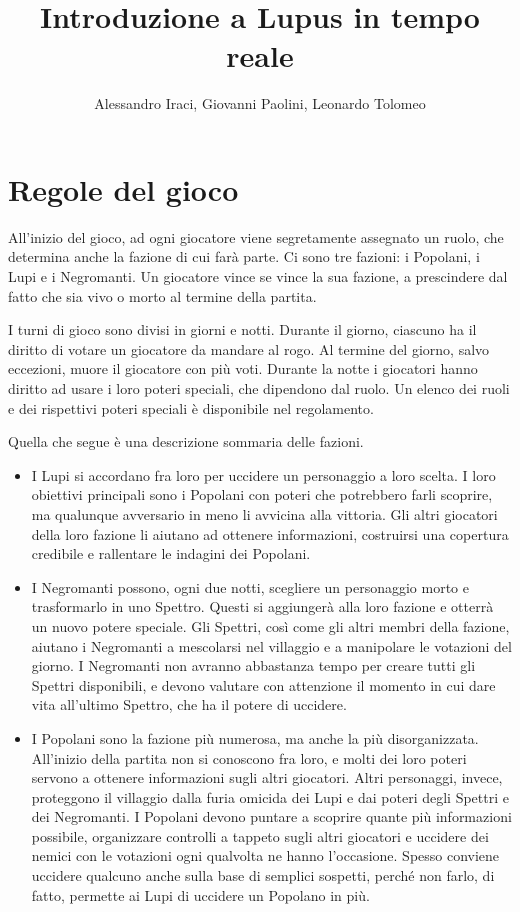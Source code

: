 \documentclass[a4paper,10pt]{article}
\title{Introduzione a Lupus in tempo reale}
\author{Alessandro Iraci, Giovanni Paolini, Leonardo Tolomeo}
\begin{document}
\maketitle



\section{Regole del gioco}

All'inizio del gioco, ad ogni giocatore viene segretamente assegnato un ruolo,
che determina anche la fazione di cui farà parte.
Ci sono tre fazioni: i Popolani, i Lupi e i Negromanti. Un giocatore vince se
vince la sua fazione, a prescindere dal fatto che sia vivo o morto
al termine della partita.

I turni di gioco sono divisi in giorni e notti. Durante il giorno, ciascuno
ha il diritto di votare un giocatore da mandare al rogo. 
Al termine del giorno, salvo eccezioni, muore il giocatore con più voti.
Durante la notte i giocatori hanno diritto ad usare i loro poteri
speciali, che dipendono dal ruolo. Un elenco dei ruoli e dei rispettivi
poteri speciali è disponibile nel regolamento.

Quella che segue è una descrizione sommaria delle fazioni.
\begin{itemize}
 \item I Lupi si accordano fra loro per uccidere un personaggio a loro scelta. 
    I loro obiettivi principali sono i Popolani con poteri che potrebbero farli scoprire,
    ma qualunque avversario in meno li avvicina alla vittoria.
    Gli altri giocatori della loro fazione li aiutano ad
    ottenere informazioni, costruirsi una copertura credibile e rallentare le indagini dei Popolani.
 \item I Negromanti possono, ogni due notti, scegliere un personaggio morto e trasformarlo in uno Spettro.
    Questi si aggiungerà alla loro fazione e otterrà un nuovo potere speciale.
    Gli Spettri, così come gli altri membri della fazione, aiutano i Negromanti a mescolarsi nel villaggio
    e a manipolare le votazioni del giorno.
    I Negromanti non avranno abbastanza tempo per creare tutti gli Spettri disponibili, e devono valutare
    con attenzione il momento in cui dare vita all'ultimo Spettro, che ha il potere di uccidere.
 \item I Popolani sono la fazione più numerosa, ma anche la più disorganizzata. All'inizio della 
    partita non si conoscono fra loro, e molti dei loro poteri servono a ottenere informazioni sugli 
    altri giocatori. Altri personaggi, invece, proteggono il villaggio dalla furia omicida dei Lupi
    e dai poteri degli Spettri e dei Negromanti.
    I Popolani devono puntare a scoprire quante più informazioni possibile, organizzare
    controlli a tappeto sugli altri giocatori e uccidere dei nemici con le votazioni ogni
    qualvolta ne hanno l'occasione. Spesso conviene uccidere qualcuno anche sulla base di
    semplici sospetti, perché non farlo, di fatto, permette ai Lupi di uccidere un Popolano
    in più.
\end{itemize}
\end{document}
